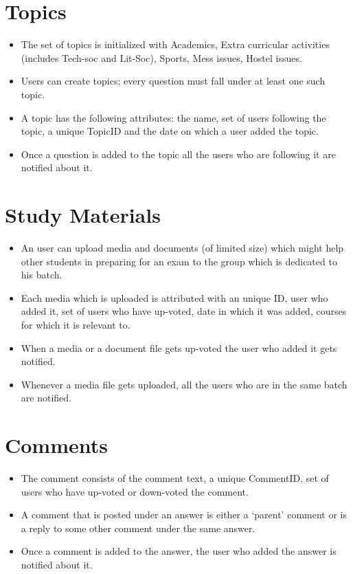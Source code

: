 \documentclass{article}
\begin{document}
\section{Topics}
\begin{itemize}
\item The set of topics is initialized with Academics, Extra curricular activities (includes Tech-soc and Lit-Soc), Sports, Mess issues, Hostel issues.
\item Users can create topics; every question must fall under at least one such topic.
\item A topic has the following attributes: the name, set of users following the topic, a unique TopicID and the date on which a user added the topic.
\item Once a question is added to the topic all the users who are following it are notified about it.

\end{itemize} 

\section{Study Materials}
\begin{itemize}
\item An user can upload media and documents (of limited size) which might help other students in preparing for an exam to the group which is dedicated to his batch.
\item Each media which is uploaded is attributed with an unique ID, user who added it, set of users who have up-voted, date in which it was added, courses for which it is relevant to.
\item When a media or a document file gets up-voted the user who added it gets notified. 
\item Whenever a media file gets uploaded, all the users who are in the same batch are notified.

\end{itemize}

\section{Comments}
\begin{itemize}
\item The comment consists of the comment text, a unique CommentID, set of users who have up-voted or down-voted the comment.
\item A comment that is posted under an answer is either a ‘parent’ comment or is a reply to some other comment under the same answer.
\item Once a comment is added to the answer, the user who added the answer is notified about it.

\end{itemize}
\end{document}
